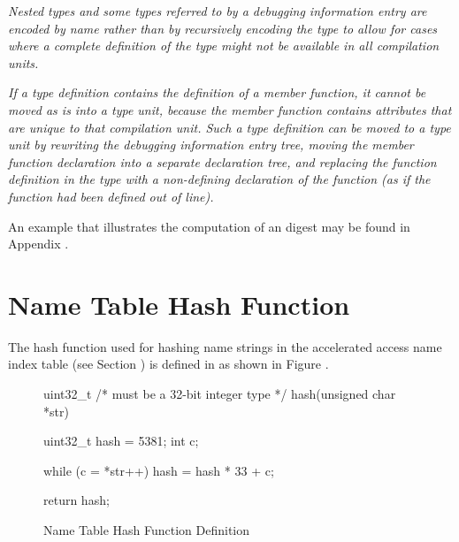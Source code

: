 \textit{Nested types and some types referred to by a debugging 
information entry are encoded by name rather than by recursively 
encoding the type to allow for cases where a complete definition 
of the type might not be available in all compilation units.}

\textit{If a type definition contains the definition of a member function, 
it cannot be moved as is into a type unit, because the member function 
contains attributes that are unique to that compilation unit. 
Such a type definition can be moved to a type unit by rewriting the 
debugging information entry tree, 
moving the member function declaration into a separate declaration tree, 
and replacing the function definition in the type with a non-defining 
declaration of the function (as if the function had been defined out of 
line).}

An example that illustrates the computation of an \MDfive{} digest may be found in 
Appendix .

\section{Name Table Hash Function}
\label{datarep:nametablehashfunction}
The hash function used for hashing name strings in the accelerated 
access name index table (see Section )
is defined in  as shown in 
Figure . 

\begin{figure}[ht]
\begin{nlnlisting}

uint32_t /* must be a 32-bit integer type */
    hash(unsigned char *str)
    {
        uint32_t hash = 5381;
        int c;

        while (c = *str++)
            hash = hash * 33 + c;

        return hash;
    }

\end{nlnlisting}
\caption{Name Table Hash Function Definition}
\label{fig:nametablehashfunctiondefinition}
\end{figure}

